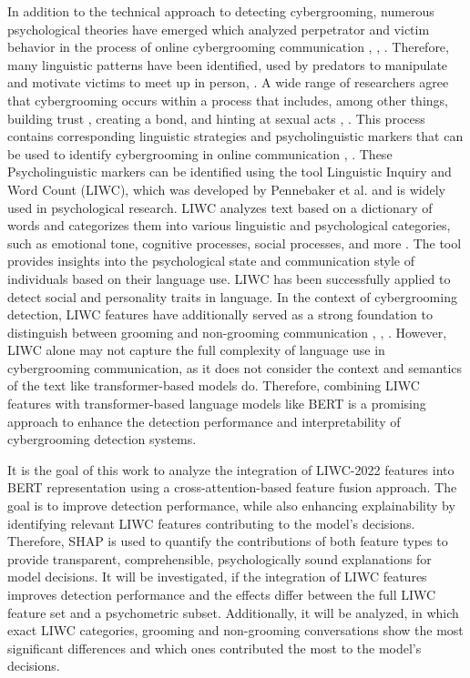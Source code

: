 In addition to the technical approach to detecting cybergrooming, numerous psychological theories have emerged which analyzed perpetrator and victim behavior in the process of online cybergrooming communication \cite{black2015linguistic}, \cite{lorenzo2016understanding}, \cite{oconnell2003typology}. Therefore, many linguistic patterns have been identified, used by predators to manipulate and motivate victims to meet up in person\cite{chiangandgrant2017online}, \cite{lorenzudus2017cause}. A wide range of researchers agree that cybergrooming occurs within a process that includes, among other things, building trust , creating a bond, and hinting at sexual acts \cite{oconnell2003typology}, \cite{lorenzudus2017cause} \cite{williamsmodel}\cite{chiangandgrant2017online} . This process contains corresponding linguistic strategies and psycholinguistic markers that can be used to identify cybergrooming in online communication \cite{black2015linguistic}, \cite{guo2023text} \cite{broome2020psycholinguistic}. These Psycholinguistic markers can be identified using the tool Linguistic Inquiry and Word Count (LIWC), which was developed by Pennebaker et al. \cite{pennebaker2022liwc} and is widely used in psychological research. LIWC analyzes text based on a dictionary of words and categorizes them into various linguistic and psychological categories, such as emotional tone, cognitive processes, social processes, and more \cite{pennebaker2022liwc}. The tool provides insights into the psychological state and communication style of individuals based on their language use. LIWC has been successfully applied to detect social and personality traits in language\cite{tausczik2010psychological}. In the context of cybergrooming detection, LIWC features have additionally served as a strong foundation to distinguish between grooming and non-grooming communication \cite{broome2020psycholinguistic}, \cite{guo2023text}, \cite{gupta2012characterizingpedophileconversationsinternet}. However, LIWC alone may not capture the full complexity of language use in cybergrooming communication, as it does not consider the context and semantics of the text like transformer-based models do. Therefore, combining LIWC features with transformer-based language models like BERT is a promising approach to enhance the detection performance and interpretability of cybergrooming detection systems.

It is the goal of this work to analyze the integration of LIWC-2022 features into BERT representation using a cross-attention-based feature fusion approach. The goal is to improve detection performance, while also enhancing explainability by identifying relevant LIWC features contributing to the model's decisions. Therefore, SHAP \cite{lundberg2017shap} is used to quantify the contributions of both feature types to provide transparent, comprehensible, psychologically sound explanations for model decisions. It will be investigated, if the integration of LIWC features improves detection performance and the effects differ between the full LIWC feature set and a psychometric subset. Additionally, it will be analyzed, in which exact LIWC categories, grooming and non-grooming conversations show the most significant differences and which ones contributed the most to the model's decisions.

